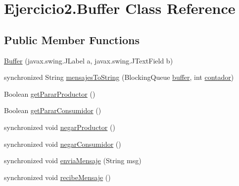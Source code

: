 \hypertarget{class_ejercicio2_1_1_buffer}{}\section{Ejercicio2.\+Buffer Class Reference}
\label{class_ejercicio2_1_1_buffer}
\subsection*{Public Member Functions}
\begin{DoxyCompactItemize}
\item 
\mbox{\hyperlink{class_ejercicio2_1_1_buffer_a3d628b4ba6b253cceefa6455fa44f164}{Buffer}} (javax.\+swing.\+J\+Label a, javax.\+swing.\+J\+Text\+Field b)
\item 
synchronized String \mbox{\hyperlink{class_ejercicio2_1_1_buffer_a434d7d9dfdec59f5a88a52ea67eeca01}{mensajes\+To\+String}} (Blocking\+Queue \mbox{\hyperlink{class_ejercicio2_1_1_buffer_a63ddce4482528c08b1023ab9ea3842ce}{buffer}}, int \mbox{\hyperlink{class_ejercicio2_1_1_buffer_a323b888df0fbc24a4fd9da8dd1960639}{contador}})
\item 
Boolean \mbox{\hyperlink{class_ejercicio2_1_1_buffer_a0ee76aa61a4ad36a541c96a6863944f0}{get\+Parar\+Productor}} ()
\item 
Boolean \mbox{\hyperlink{class_ejercicio2_1_1_buffer_aad0c2fc26ac6bedd2c027867f2026f32}{get\+Parar\+Consumidor}} ()
\item 
synchronized void \mbox{\hyperlink{class_ejercicio2_1_1_buffer_ac99f2fdd7322cc95e1fa807cc7b60476}{negar\+Productor}} ()
\item 
synchronized void \mbox{\hyperlink{class_ejercicio2_1_1_buffer_a9b87c49cad4ed9c88c5bfb48376bb8d4}{negar\+Consumidor}} ()
\item 
synchronized void \mbox{\hyperlink{class_ejercicio2_1_1_buffer_ab6e3390ea3256bde697612255687aafc}{envia\+Mensaje}} (String msg)
\item 
synchronized void \mbox{\hyperlink{class_ejercicio2_1_1_buffer_a3e868b19d6ff03945998803e3384615c}{recibe\+Mensaje}} ()
\end{DoxyCompactItemize}
